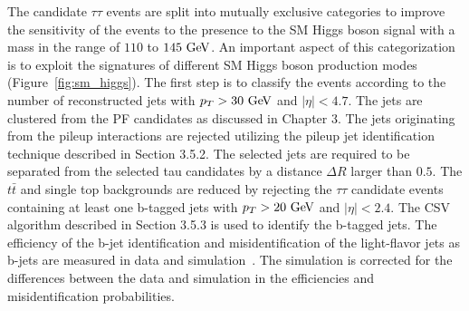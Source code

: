 The candidate $\tau\tau$  events are split into mutually exclusive categories to improve the sensitivity of the events to the presence to the SM Higgs boson signal with a mass in the range of $110$ to $145~\mathrm{Ge\kern -0.1em V}$. An important aspect of this categorization is to exploit the signatures of different SM Higgs boson production modes (Figure~\ref{fig:sm_higgs}). The first step is to classify the events according to the number of reconstructed jets with $p_{T}>30~\mathrm{Ge\kern -0.1em V}$ and $|\eta|<4.7$. The jets are clustered from the PF candidates as discussed in Chapter 3. The jets originating from the pileup interactions are rejected utilizing the pileup jet identification technique described in Section 3.5.2. The selected jets are  required to be separated from the selected tau candidates by a distance $\Delta R$ larger than $0.5$. The $t\bar{t}$ and single top backgrounds are reduced by rejecting the $\tau\tau$ candidate events containing at least one b-tagged jets with $p_{T}>20~\mathrm{Ge\kern -0.1em V}$ and $|\eta|<2.4$. The CSV algorithm described in Section 3.5.3 is used to identify the b-tagged jets. The efficiency of the b-jet identification and misidentification of the light-flavor jets as b-jets are measured in data and simulation~\cite{Chatrchyan:2012jua}. The simulation is corrected for the differences between the data and simulation in the efficiencies and misidentification probabilities.

